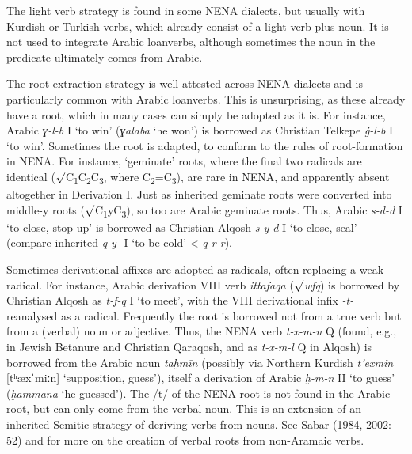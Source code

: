 \documentclass[output=paper]{langsci/langscibook}
\begin{document}
The light verb strategy is found in some NENA dialects, but usually with Kurdish or Turkish verbs, which already consist of a light verb plus noun. It is not used to integrate Arabic loanverbs, although sometimes the noun in the predicate ultimately comes from Arabic.

The root-extraction strategy is well attested across NENA dialects and is particularly common with Arabic loanverbs. This is unsurprising, as these already have a root, which in many cases can simply be adopted as it is. For instance, Arabic \textit{ɣ-l-b} I ‘to win’ (\textit{ɣalaba} ‘he won’) is borrowed as Christian Telkepe \textit{\.g\nobreakdash-l\nobreakdash-b} I ‘to win’. Sometimes the root is adapted, to conform to the rules of root-formation in NENA. For instance, ‘geminate’ roots, where the final two radicals are identical (${\surd}$C\textsubscript{1}C\textsubscript{2}C\textsubscript{3}, where C\textsubscript{2}=C\textsubscript{3}), are rare in NENA, and apparently absent altogether in Derivation I. Just as inherited geminate roots were converted into middle-y roots (${\surd}$C\textsubscript{1}yC\textsubscript{3}), so too are Arabic geminate roots. Thus, Arabic \textit{s-d-d} I ‘to close, stop up’ is borrowed as Christian Alqosh \textit{s-y-d}\textbf{ }I ‘to close, seal’ (compare inherited \textit{q-y-\R} I ‘to be cold’ < \textit{q-r-r}).

Sometimes derivational affixes are adopted as radicals, often replacing a weak radical. For instance, Arabic derivation VIII verb \textit{ittafaqa} (${\surd}$\textit{wfq}) is borrowed by Christian Alqosh as \textit{t\nobreakdash-f\nobreakdash-q} I ‘to meet’, with the VIII derivational infix \textit{\nobreakdash-t\nobreakdash-} reanalysed as a radical. Frequently the root is borrowed not from a true verb but from a (verbal) noun or adjective. Thus, the NENA verb \textit{t\nobreakdash-x\nobreakdash-m\nobreakdash-n} Q (found, e.g., in Jewish Betanure and Christian Qaraqosh, and as \textit{t\nobreakdash-x\nobreakdash-m\nobreakdash-l} Q in Alqosh) is borrowed from the Arabic noun \textit{taḫmīn} (possibly via Northern Kurdish \textit{t’exmîn} [tʰæxˈmiːn] ‘supposition, guess’), itself a derivation of Arabic \textit{ḫ\nobreakdash-m\nobreakdash-n} II ‘to guess’ (\textit{ḫammana} ‘he guessed’). The /t/ of the NENA root is not found in the Arabic root, but can only come from the verbal noun. This is an extension of an inherited Semitic strategy of deriving verbs from nouns. See Sabar (1984, 2002: 52) and \citet[166]{Garbell1965} for more on the creation of verbal roots from non-Aramaic verbs.
\end{document}
